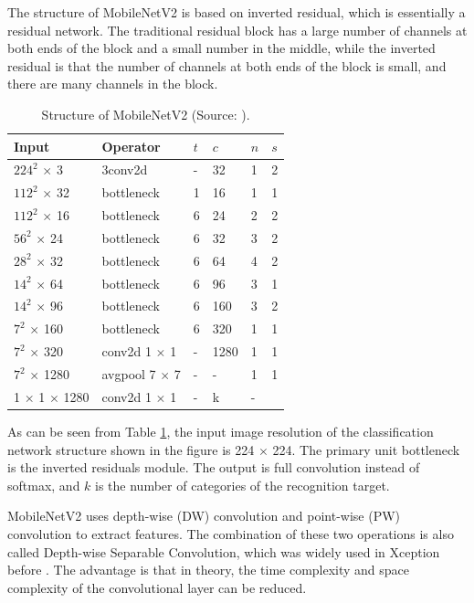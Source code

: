 \documentclass[journal,article,submit,moreauthors,pdftex]{Definitions/mdpi}
\begin{document}
The structure of MobileNetV2 is based on inverted residual, which is essentially a residual network. The traditional residual block has a large number of channels at both ends of the block and a small number in the middle, while the inverted residual is that the number of channels at both ends of the block is small, and there are many channels in the block.


\begin{table}[htbp]
\centering
\caption{Structure of MobileNetV2 (Source: \cite{sandler2018mobilenetv2}).}
\begin{tabular}{llllll} 
\toprule
\textbf{Input}&\textbf{Operator}&\textbf{$t$}&\textbf{$c$}&\textbf{$n$}&\textbf{$s$}\\
\midrule
$224^2$ $\times$ 3&3conv2d & - & 32 & 1 & 2\\
$112^2$ $\times$ 32& bottleneck & 1 & 16 & 1 &1\\
$112^2$ $\times$ 16& bottleneck & 6 & 24 & 2 &2\\
$56^2$ $\times$ 24& bottleneck & 6 & 32 & 3 &2\\
$28^2$ $\times$ 32& bottleneck & 6 & 64 & 4 &2\\
$14^2$ $\times$ 64& bottleneck & 6 & 96 & 3 &1\\
$14^2$ $\times$ 96& bottleneck & 6 & 160 & 3 &2\\
$7^2$ $\times$ 160& bottleneck & 6 & 320 & 1 &1\\
$7^2$ $\times$ 320& conv2d 1 $\times$ 1 & - & 1280 & 1 &1\\
$7^2$ $\times$ 1280& avgpool 7 $\times$ 7& - & - & 1& 1\\
1 $\times$ 1 $\times$ 1280& conv2d 1 $\times$ 1& - & k & - & \\
\bottomrule
\end{tabular}
\label{tbl:MobileNetV2}
\end{table}



As can be seen from Table \ref{tbl:MobileNetV2}, the input image resolution of the classification network structure shown in the figure is 224 $\times$ 224. The primary unit bottleneck is the inverted residuals module. The output is full convolution instead of softmax, and $k$ is the number of categories of the recognition target.

MobileNetV2 uses depth-wise (DW) convolution and point-wise (PW) convolution to extract features. The combination of these two operations is also called Depth-wise Separable Convolution, which was widely used in Xception before \cite{sandler2018mobilenetv2}. The advantage is that in theory, the time complexity and space complexity of the convolutional layer can be reduced.
\end{document}
